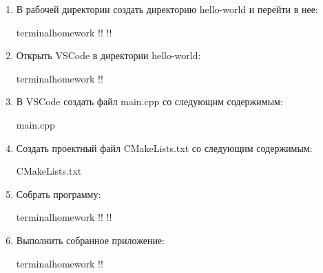 \documentclass[14pt]{extarticle}
\begin{document}
\begin{enumerate}

        \item В рабочей директории создать директорию hello-world и перейти в нее:

            \begin{terminalwindow}{terminalhomework}
!!
!!
            \end{terminalwindow}

        \item Открыть VSCode в директории hello-world:

            \begin{terminalwindow}{terminalhomework}
!!
            \end{terminalwindow}

        \item В VSCode создать файл main.cpp со следующим содержимым:

                {main.cpp}

        \item Создать проектный файл CMakeLists.txt со следующим содержимым:

                {CMakeLists.txt}

        \item Собрать программу:

            \begin{terminalwindow}{terminalhomework}
!!
!!
            \end{terminalwindow}

        \item Выполнить собранное приложение:

            \begin{terminalwindow}{terminalhomework}
!!
            \end{terminalwindow}

\end{enumerate}
\end{document}
